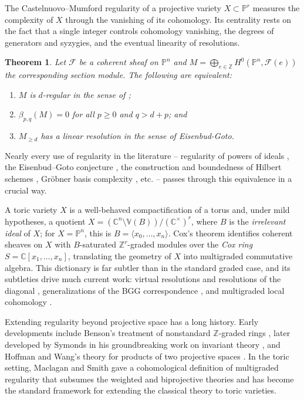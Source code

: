 \documentclass[11pt,reqno]{amsart}
\newtheorem{theorem}[lemma]{Theorem}
\theoremstyle{remark}
\newcommand{\CC}{\mathbb{C}}
\newcommand{\PP}{\mathbb{P}}
\newcommand{\VV}{\mathbb{V}}
\newcommand{\ZZ}{\mathbb{Z}}
\newcommand{\cF}{\mathcal{F}}
\begin{document}
The Castelnuovo--Mumford regularity of a projective variety $X\subset \PP^{r}$ measures the complexity of $X$ through the vanishing of its cohomology. Its centrality rests on the fact that a single integer controls cohomology vanishing, the degrees of generators and syzygies, and the eventual linearity of resolutions.

\begin{theorem}\cite{eisenbudGoto84}\label{thm:eisenbud-goto}
Let $\cF$ be a coherent sheaf on $\PP^{n}$ and $M=\bigoplus_{e\in\ZZ} H^0(\PP^{n},\cF(e))$ the corresponding section module. The following are equivalent: 
\begin{enumerate}
\item $M$ is $d$-regular in the sense of \cite{mumford65};
\item $\beta_{p,q}(M)=0$ for all $p\geq0$ and $q>d+p$; and
\item $M_{\geq d}$ has a linear resolution in the sense of Eisenbud-Goto.
\end{enumerate}
\end{theorem}


Nearly every use of regularity in the literature -- regularity of powers of ideals \cite{CHT99,Kodiyalam00}, the Eisenbud--Goto conjecture \cite{MP18}, the construction and boundedness of Hilbert schemes \cite{grothendieck61,gotzmann78}, Gr\"obner basis complexity \cite{bayerStillman87}, etc. -- passes through this equivalence in a crucial way.

A toric variety $X$ is a well-behaved compactification of a torus and, under mild hypotheses, a quotient $X=(\CC^{n}\setminus \VV(B))/(\CC^{\times})^r$, where $B$ is the \emph{irrelevant ideal} of $X$; for $X = \PP^n$, this is $B=\langle x_0,\ldots,x_n\rangle$. Cox's theorem \cite{cox95} identifies coherent sheaves on $X$ with $B$-saturated $\ZZ^r$-graded modules over the \emph{Cox ring} $S=\CC[x_1,\ldots,x_n]$, translating the geometry of $X$ into multigraded commutative algebra. This dictionary is far subtler than in the standard graded case, and its subtleties drive much current work: virtual resolutions and resolutions of the diagonal \cite{BES20, HHL24, brownErman24-1, faveroHuang23}, generalizations of the BGG correspondence \cite{EES15,brownErmanTate}, and multigraded local cohomology \cite{botbolChardin17, chardinNemati20}.

Extending regularity beyond projective space has a long history. Early developments include Benson's treatment of nonstandard $\ZZ$-graded rings \cite{benson04}, later developed by Symonds in his groundbreaking work on invariant theory \cite{symonds10,symonds11}, and Hoffman and Wang's theory for products of two projective spaces \cite{hoffmanWang04}. In the toric setting, Maclagan and Smith gave a cohomological definition of multigraded regularity \cite{maclaganSmith04} that subsumes the weighted and biprojective theories and has become the standard framework for extending the classical theory to toric varieties.
\end{document}
